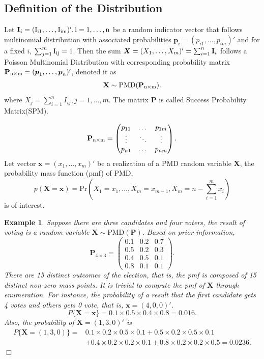 \documentclass[12pt]{article}
\newcommand{\Ivec}{{\boldsymbol{\rm I}}}
\newcommand{\Xmat}{\mathbf{X}}
\newcommand{\Pmat}{\mathbf{P}}
\newcommand{\pvec}{\boldsymbol{p}}
\newcommand{\PMD}{\textrm{PMD}}
\newcommand{\Xvec}{\boldsymbol{X}}
\newcommand{\xvec}{\boldsymbol{x}}
\newcommand{\qedw}{\hfill \ensuremath{\Box}}
\newtheorem{example}{Example}
\begin{document}
\subsection{Definition of the Distribution}

Let $\Ivec_{i} = (\rm I_{i1}, \dots, I_{im})', i=1, \dots, n$ be a random indicator vector that follows multinomial distribution with associated probabilities $\pvec_{i} = (p_{i1}, \dots, p_{im})'$ and for a fixed $i$, $\sum_{j=1}^{m}\rm I_{ij}=1$. Then the sum $\Xvec = (X_{1}, \dots, X_{m})'= \sum_{i=1}^{n}\Ivec_{i}$ follows a Poisson Multinomial Distribution with corresponding probability matrix $\Pmat_{\rm n \times m} = (\pvec_{1}, \dots, \pvec_{n})'$, denoted it as
$$\Xmat \sim \PMD(\Pmat_{\rm n\times m}).$$ where $X_{j} = \sum_{i=1}^{n} I_{ij}, j=1,\dots,m$. The matrix $\Pmat$ is called Success Probability Matrix(SPM). 

\begin{equation*}
\Pmat_{\rm n \times m} = \begin{pmatrix}
p_{11} &  \dots & p_{1m} \\
\vdots & \ddots & \vdots \\
p_{n1} &  \dots & p_{nm} \\
\end{pmatrix}.
\end{equation*}
Let vector $\xvec = (x_1,\dots,x_m)'$ be a realization of a $\PMD$ random variable $\Xmat$, the probability mass function (pmf) of PMD,
$$p(\Xmat=\xvec) = \text{Pr} \left( X_1 = x_1, \dots, X_m = x_{m-1}, X_{m} = n-\sum_{i=1}^{m}x_i \right)$$
is of interest. 

\begin{example}\normalfont
Suppose there are three candidates and four voters, the result of voting is a random variable $\Xmat \sim \PMD(\Pmat)$. Based on prior information, 
\begin{equation*}
\Pmat_{4 \times 3} = \begin{pmatrix}
0.1 &  0.2 & 0.7\\
0.5 & 0.2 & 0.3\\
0.4 &  0.5 & 0.1\\
0.8 & 0.1 & 0.1
\end{pmatrix}.
\end{equation*}
There are 15 distinct outcomes of the election, that is, the pmf is composed of 15 distinct non-zero mass points. It is trivial to compute the pmf of $\Xmat$ through enumeration. For instance, the probability of a result that the first candidate gets 4 votes and others gets 0 vote, that is, $\xvec =  (4,0,0)'$.
\begin{equation*}
P\{\Xmat = \xvec \} = 0.1\times 0.5 \times 0.4 \times 0.8 = 0.016.
\end{equation*}
Also, the probability of $\Xmat=(1,3,0)'$ is
\begin{align*}
P\{\Xmat = (1,3,0)\}  =  & 0.1\times 0.2 \times 0.5 \times 0.1 +
 0.5\times0.2\times0.5 \times 0.1 \\
 & + 0.4\times0.2\times0.2\times0.1 + 0.8\times0.2\times0.2\times0.5 = 0.0236.
\end{align*}
\qedw
\end{example}
\end{document}
